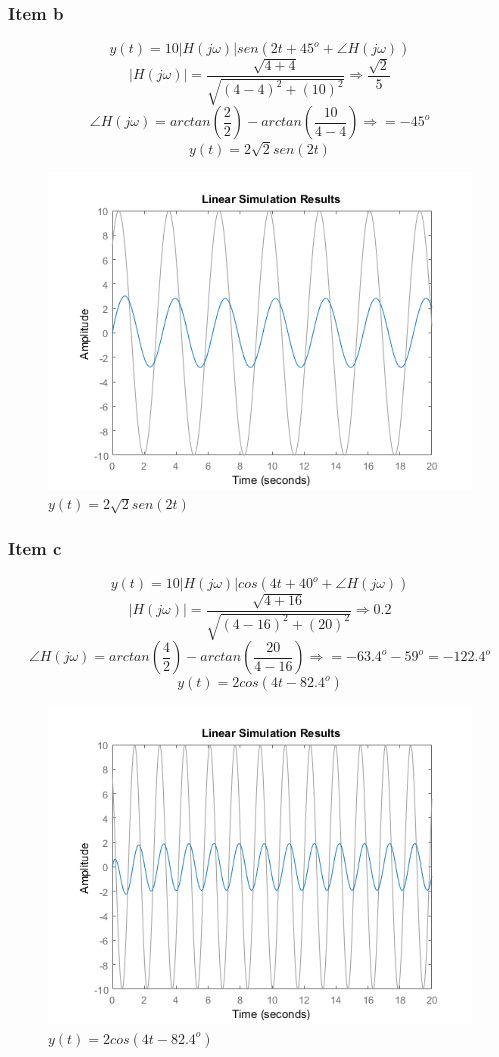 \documentclass[a4paper, 12pt]{article}
\begin{document}
        \subsubsection{Item b}
        \[y(t) = 10|H(j\omega)|sen(2t + 45^{o} + \angle H(j\omega))\]
        \[|H(j\omega)| = \frac{\sqrt{4 + 4}}{\sqrt{(4 -4)^{2} + (10)^{2}}} \Rightarrow \frac{\sqrt{2}}{5} \]
        \[\angle H(j\omega) = arctan \left(\frac{2}{2}\right) - arctan \left(\frac{10}{4-4}\right) \Rightarrow = -45^{o}\]
        \[y(t) = 2\sqrt{2}sen(2t)\]     
		\begin{figure}[!ht]
			\centering
			\includegraphics{img/Q4b.png}
			\caption{$y(t) = 2\sqrt{2}sen(2t)$}	
		\end{figure}	           
        \subsubsection{Item c}
        \[y(t) = 10|H(j\omega)|cos(4t + 40^{o} + \angle H(j\omega))\]
        \[|H(j\omega)| = \frac{\sqrt{4 + 16}}{\sqrt{(4 -16)^{2} + (20)^{2}}} \Rightarrow 0.2 \]
        \[\angle H(j\omega) = arctan \left(\frac{4}{2}\right) - arctan \left(\frac{20}{4-16}\right) \Rightarrow = -63.4^{o} - 59^{o} = -122.4^{o}\]
        \[y(t) = 2cos(4t -82.4^{o})\]          
		\begin{figure}[!ht]
			\centering
			\includegraphics{img/Q4c.png}
			\caption{$y(t) = 2cos(4t -82.4^{o})$}	
		\end{figure}	        
\end{document}
